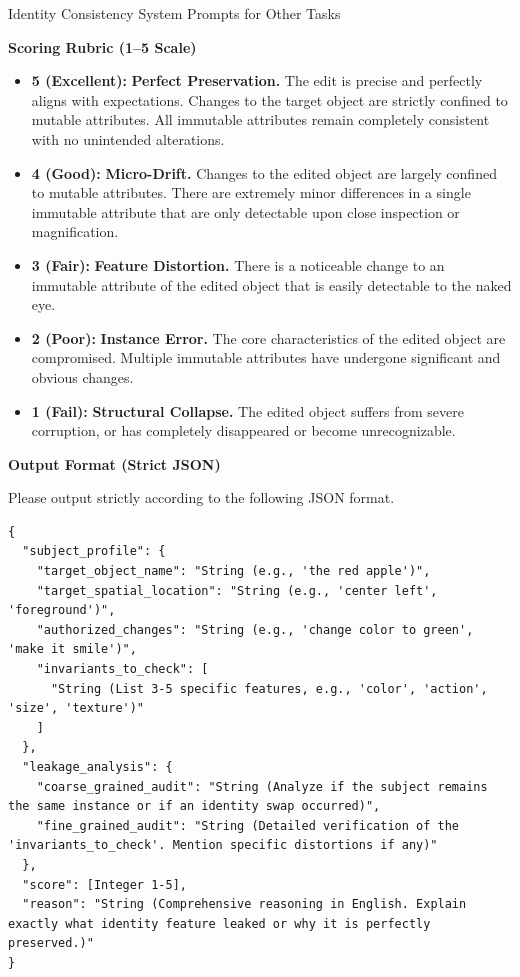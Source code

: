\begin{promptbox}[label={System Prompts: IC_Other_Tasks}]{Identity Consistency System Prompts for Other Tasks}
\medskip

\textbf{Scoring Rubric (1--5 Scale)}

\begin{itemize}[leftmargin=2.2em, labelsep=0.5em, itemsep=2pt]
    \item \textbf{5 (Excellent):} \textbf{Perfect Preservation.} The edit is precise and perfectly aligns with expectations. Changes to the target object are strictly confined to mutable attributes. All immutable attributes remain completely consistent with no unintended alterations.
    
    \item \textbf{4 (Good):} \textbf{Micro-Drift.} Changes to the edited object are largely confined to mutable attributes. There are extremely minor differences in a single immutable attribute that are only detectable upon close inspection or magnification.
    
    \item \textbf{3 (Fair):} \textbf{Feature Distortion.} There is a noticeable change to an immutable attribute of the edited object that is easily detectable to the naked eye.
    
    \item \textbf{2 (Poor):} \textbf{Instance Error.} The core characteristics of the edited object are compromised. Multiple immutable attributes have undergone significant and obvious changes.
    
    \item \textbf{1 (Fail):} \textbf{Structural Collapse.} The edited object suffers from severe corruption, or has completely disappeared or become unrecognizable.
\end{itemize}

\medskip

\textbf{Output Format (Strict JSON)}

Please output strictly according to the following JSON format.

\begin{lstlisting}
{
  "subject_profile": {
    "target_object_name": "String (e.g., 'the red apple')",
    "target_spatial_location": "String (e.g., 'center left', 'foreground')",
    "authorized_changes": "String (e.g., 'change color to green', 'make it smile')",
    "invariants_to_check": [
      "String (List 3-5 specific features, e.g., 'color', 'action', 'size', 'texture')"
    ]
  },
  "leakage_analysis": {
    "coarse_grained_audit": "String (Analyze if the subject remains the same instance or if an identity swap occurred)",
    "fine_grained_audit": "String (Detailed verification of the 'invariants_to_check'. Mention specific distortions if any)"
  },
  "score": [Integer 1-5],
  "reason": "String (Comprehensive reasoning in English. Explain exactly what identity feature leaked or why it is perfectly preserved.)"
}
\end{lstlisting}

\end{promptbox}


